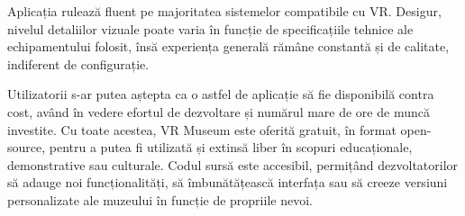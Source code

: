 Aplicația rulează fluent pe majoritatea sistemelor compatibile cu VR. Desigur, nivelul detaliilor vizuale poate varia în funcție de specificațiile tehnice ale echipamentului folosit, însă experiența generală rămâne constantă și de calitate, indiferent de configurație.

Utilizatorii s-ar putea aștepta ca o astfel de aplicație să fie disponibilă contra cost, având în vedere efortul de dezvoltare și numărul mare de ore de muncă investite. Cu toate acestea, VR Museum este oferită gratuit, în format open-source, pentru a putea fi utilizată și extinsă liber în scopuri educaționale, demonstrative sau culturale. Codul sursă este accesibil, permițând dezvoltatorilor să adauge noi funcționalități, să îmbunătățească interfața sau să creeze versiuni personalizate ale muzeului în funcție de propriile nevoi.